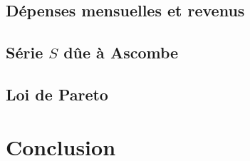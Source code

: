 \documentclass[12pt,french,titlepage]{article}
\begin{document}
	\subsection{Dépenses mensuelles et revenus}
	
	\subsection{Série $S$ dûe à Ascombe}
	
	\subsection{Loi de Pareto}
	
	\section{Conclusion}
	
	
	
\end{document}
